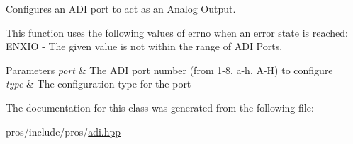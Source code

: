 Configures an A\+DI port to act as an Analog Output.

This function uses the following values of errno when an error state is reached\+: E\+N\+X\+IO -\/ The given value is not within the range of A\+DI Ports.


\begin{DoxyParams}{Parameters}
{\em port} & The A\+DI port number (from 1-\/8, \textquotesingle{}a\textquotesingle{}-\/\textquotesingle{}h\textquotesingle{}, \textquotesingle{}A\textquotesingle{}-\/\textquotesingle{}H\textquotesingle{}) to configure \\
\hline
{\em type} & The configuration type for the port \\
\hline
\end{DoxyParams}


The documentation for this class was generated from the following file\+:\begin{DoxyCompactItemize}
\item 
pros/include/pros/\hyperlink{adi_8hpp}{adi.\+hpp}\end{DoxyCompactItemize}
